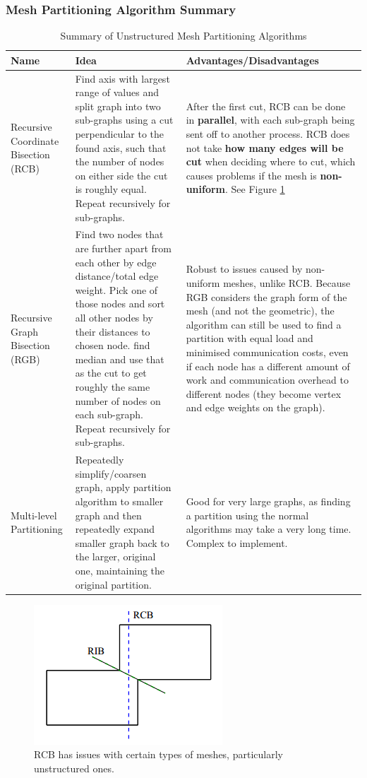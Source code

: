 \documentclass{article}
\begin{document}
\subsubsection{Mesh Partitioning Algorithm Summary}

\begin{table}[H]
	\centering
	\begin{tabular}{|p{4.5cm}|p{6cm}|p{5.5cm}|}
		\hline	
		\textbf{Name} & \textbf{Idea} & \textbf{Advantages/Disadvantages} \\
		\hline
		Recursive Coordinate Bisection (RCB) & Find axis with largest range of values and split graph into two sub-graphs using a cut perpendicular to the found axis, such that the number of nodes on either side the cut is roughly equal. Repeat recursively for sub-graphs. & After the first cut, RCB can be done in \textbf{parallel}, with each sub-graph being sent off to another process. RCB does not take \textbf{how many edges will be cut} when deciding where to cut, which causes problems if the mesh is \textbf{non-uniform}. See Figure \ref{fig:rcb-issue} \\
		Recursive Graph Bisection (RGB) &  Find two nodes that are further apart from each other by edge distance/total edge weight. Pick one of those nodes and sort all other nodes by their distances to chosen node. find median and use that as the cut to get roughly the same number of nodes on each sub-graph. Repeat recursively for sub-graphs. & Robust to issues caused by non-uniform meshes, unlike RCB. Because RGB considers the graph form of the mesh (and not the geometric), the algorithm can still be used to find a partition with equal load and minimised communication costs, even if each node has a different amount of work and communication overhead to different nodes (they become vertex and edge weights on the graph). \\
		Multi-level Partitioning & Repeatedly simplify/coarsen graph, apply partition algorithm to smaller graph and then repeatedly expand smaller graph back to the larger, original one, maintaining the original partition. & Good for very large graphs, as finding a partition using the normal algorithms may take a very long time. Complex to implement. \\
		\hline		
	\end{tabular}
	\caption{Summary of Unstructured Mesh Partitioning Algorithms}
\end{table}

\begin{figure}
	\centering
	\includegraphics[scale=0.8]{figures/rcb-issue.png}
	\caption{RCB has issues with certain types of meshes, particularly unstructured ones.}
	\label{fig:rcb-issue}
\end{figure}
\end{document}
